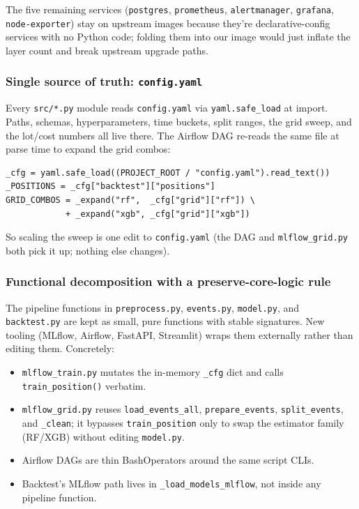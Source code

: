 \documentclass[11pt,a4paper]{article}
\begin{document}
The five remaining services (\texttt{postgres}, \texttt{prometheus}, \texttt{alertmanager}, \texttt{grafana}, \texttt{node-exporter}) stay on upstream images because they're declarative-config services with no Python code; folding them into our image would just inflate the layer count and break upstream upgrade paths.

\subsubsection{Single source of truth: \texttt{config.yaml}}
Every \texttt{src/*.py} module reads \texttt{config.yaml} via \texttt{yaml.safe\_load} at import. Paths, schemas, hyperparameters, time buckets, split ranges, the grid sweep, and the lot/cost numbers all live there. The Airflow DAG re-reads the same file at parse time to expand the grid combos:

\begin{lstlisting}[style=pystyle]
_cfg = yaml.safe_load((PROJECT_ROOT / "config.yaml").read_text())
_POSITIONS = _cfg["backtest"]["positions"]
GRID_COMBOS = _expand("rf",  _cfg["grid"]["rf"]) \
            + _expand("xgb", _cfg["grid"]["xgb"])
\end{lstlisting}

So scaling the sweep is one edit to \texttt{config.yaml} (the DAG and \texttt{mlflow\_grid.py} both pick it up; nothing else changes).

\subsubsection{Functional decomposition with a preserve-core-logic rule}
The pipeline functions in \texttt{preprocess.py}, \texttt{events.py}, \texttt{model.py}, and \texttt{backtest.py} are kept as small, pure functions with stable signatures. New tooling (MLflow, Airflow, FastAPI, Streamlit) wraps them externally rather than editing them. Concretely:

\begin{itemize}[leftmargin=1.5em,itemsep=0pt]
  \item \texttt{mlflow\_train.py} mutates the in-memory \texttt{\_cfg} dict and calls \texttt{train\_position()} verbatim.
  \item \texttt{mlflow\_grid.py} reuses \texttt{load\_events\_all}, \texttt{prepare\_events}, \texttt{split\_events}, and \texttt{\_clean}; it bypasses \texttt{train\_position} only to swap the estimator family (RF/XGB) without editing \texttt{model.py}.
  \item Airflow DAGs are thin BashOperators around the same script CLIs.
  \item Backtest's MLflow path lives in \texttt{\_load\_models\_mlflow}, not inside any pipeline function.
\end{itemize}
\end{document}
